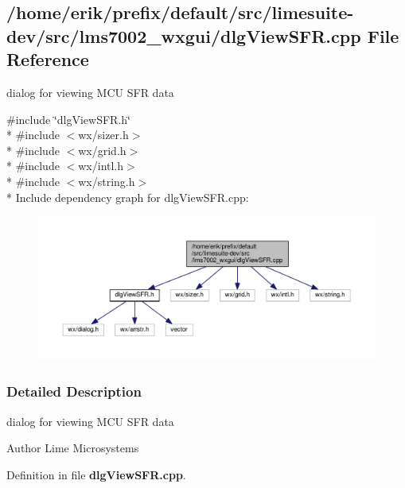 \subsection{/home/erik/prefix/default/src/limesuite-\/dev/src/lms7002\+\_\+wxgui/dlg\+View\+S\+FR.cpp File Reference}
\label{dlgViewSFR_8cpp}


dialog for viewing M\+CU S\+FR data  


{\ttfamily \#include \char`\"{}dlg\+View\+S\+F\+R.\+h\char`\"{}}\\*
{\ttfamily \#include $<$wx/sizer.\+h$>$}\\*
{\ttfamily \#include $<$wx/grid.\+h$>$}\\*
{\ttfamily \#include $<$wx/intl.\+h$>$}\\*
{\ttfamily \#include $<$wx/string.\+h$>$}\\*
Include dependency graph for dlg\+View\+S\+F\+R.\+cpp\+:
\nopagebreak
\begin{figure}[H]
\begin{center}
\leavevmode
\includegraphics[width=350pt]{da/d4c/dlgViewSFR_8cpp__incl}
\end{center}
\end{figure}


\subsubsection{Detailed Description}
dialog for viewing M\+CU S\+FR data 

\begin{DoxyAuthor}{Author}
Lime Microsystems 
\end{DoxyAuthor}


Definition in file {\bf dlg\+View\+S\+F\+R.\+cpp}.


